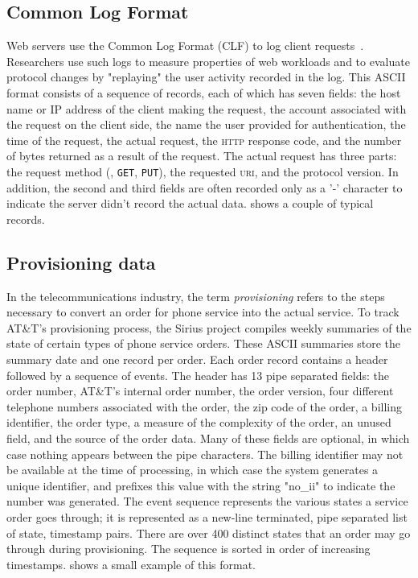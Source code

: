\documentclass{sig-alternate}
\newcommand{\dibbler}{Sirius}
\begin{document}
\subsection{Common Log Format}
Web servers use the Common Log Format (CLF) to log client
requests~\cite{wpp}.  Researchers use such logs to measure
properties of web workloads and to evaluate protocol changes
by "replaying" the user activity recorded in the log.
This ASCII format consists of a sequence of
records, each of which has seven fields: the host name or IP address
of the client making the request, the account associated with the
request on the client side, the name the user provided for
authentication, the time of the request, the actual request, the
\textsc{http} response code, and the number of bytes returned as a
result of the request.  The actual request has three parts: the
request method (\eg, \texttt{GET}, \texttt{PUT}), the requested
\textsc{uri}, and the protocol version.  In addition, the second and
third fields are often recorded only as a '-' character to indicate
the server didn't record the actual data.  
shows a couple of typical records.


\subsection{Provisioning data}
In the telecommunications industry, the term \textit{provisioning} refers to the steps necessary to convert an order for phone service into the actual 
service.  
To track AT\&T's provisioning process, the \dibbler{} project compiles
weekly summaries of the state of certain types of phone service orders.  
These ASCII summaries store the summary date and one record per order.
Each order record contains a header followed by a sequence of events.
The header has 13 pipe separated fields: the order number, AT\&T's
internal order number, the order version, four different telephone
numbers associated with the order, the zip code of the order, a
billing identifier, the order type, a measure of the complexity of the
order, an unused field, and the source of the order data.  Many of
these fields are optional, in which case nothing appears between the
pipe characters.  The billing identifier may not be available at the
time of processing, in which case the system generates a unique
identifier, and prefixes this value with the string "no\_ii" to
indicate the number was generated. The event sequence represents the
various states a service order goes through; it is represented as a
new-line terminated, pipe separated list of state, timestamp pairs.
There are over 400 distinct states that an order may go through during
provisioning.  The sequence is sorted in order of increasing timestamps.  shows a small example of
this format.
\end{document}
